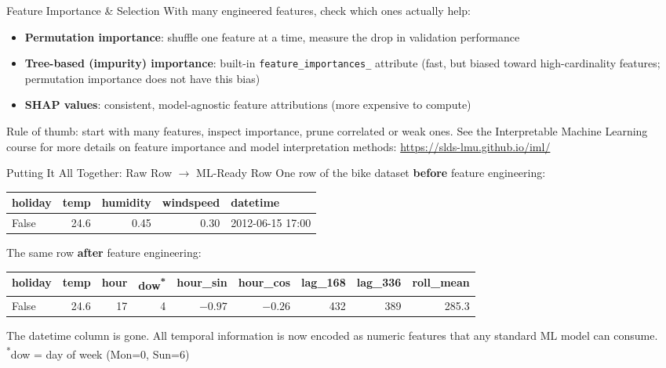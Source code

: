\documentclass[11pt,compress,t,notes=noshow, xcolor=table]{beamer}
\begin{document}
\begin{vbframe}{Feature Importance \& Selection}
\vfill
With many engineered features, check which ones actually help:
\vfill
\begin{itemize}
    \item \textbf{Permutation importance}: shuffle one feature at a time, measure the drop in validation performance
    \item \textbf{Tree-based (impurity) importance}: built-in \texttt{feature\_importances\_} attribute (fast, but biased toward high-cardinality features; permutation importance does not have this bias)
    \item \textbf{SHAP values}: consistent, model-agnostic feature attributions (more expensive to compute)
\end{itemize}
\vfill
Rule of thumb: start with many features, inspect importance, prune correlated or weak ones.
\vfill
See the Interpretable Machine Learning course for more details on feature importance and model interpretation methods: \url{https://slds-lmu.github.io/iml/}
\vfill
\end{vbframe}

\begin{vbframe}{Putting It All Together: Raw Row $\rightarrow$ ML-Ready Row}
\vfill
\footnotesize
One row of the bike dataset \textbf{before} feature engineering:
\vspace{0.3em}

\begin{tabular}{lrrrl}
\toprule
holiday & temp & humidity & windspeed & datetime \\
\midrule
False & 24.6 & 0.45 & 0.30 & 2012-06-15 17:00 \\
\bottomrule
\end{tabular}

\vspace{0.8em}
The same row \textbf{after} feature engineering:
\vspace{0.3em}

\scriptsize
\begin{tabular}{lr|rr|rr|rr|r}
\toprule
holiday & temp & hour & dow\textsuperscript{*} & hour\_sin & hour\_cos & lag\_168 & lag\_336 & roll\_mean \\
\midrule
False & 24.6 & 17 & 4 & $-0.97$ & $-0.26$ & 432 & 389 & 285.3 \\
\bottomrule
\end{tabular}

\vspace{0.5em}
\normalsize
The datetime column is gone. All temporal information is now encoded as numeric features that any standard ML model can consume.\\
\textsuperscript{*}dow = day of week (Mon=0, Sun=6)
\vfill
\end{vbframe}


\endlecture
\end{document}
